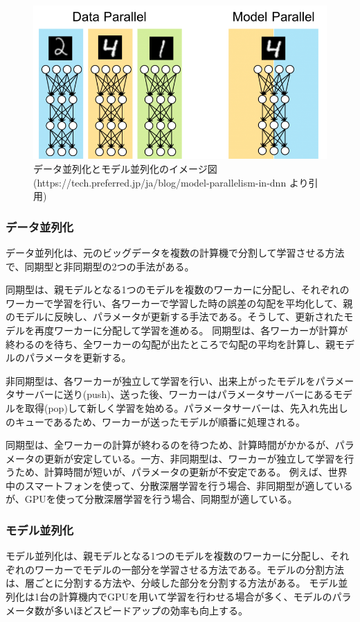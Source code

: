 \documentclass{ltjsarticle}
\begin{document}
\begin{figure}[htbp]
  \centering
  \includegraphics[width=15cm]{./capture/parallelism.png}
  \caption{データ並列化とモデル並列化のイメージ図(https://tech.preferred.jp/ja/blog/model-parallelism-in-dnn より引用)}
  \label{fig:parallelism}
\end{figure}

\subsubsection{データ並列化}
データ並列化は、元のビッグデータを複数の計算機で分割して学習させる方法で、同期型と非同期型の2つの手法がある。
\par
同期型は、親モデルとなる1つのモデルを複数のワーカーに分配し、それぞれのワーカーで学習を行い、各ワーカーで学習した時の誤差の勾配を平均化して、親のモデルに反映し、パラメータが更新する手法である。そうして、更新されたモデルを再度ワーカーに分配して学習を進める。
同期型は、各ワーカーが計算が終わるのを待ち、全ワーカーの勾配が出たところで勾配の平均を計算し、親モデルのパラメータを更新する。
\par
非同期型は、各ワーカーが独立して学習を行い、出来上がったモデルをパラメータサーバーに送り(push)、送った後、ワーカーはパラメータサーバーにあるモデルを取得(pop)して新しく学習を始める。パラメータサーバーは、先入れ先出しのキューであるため、ワーカーが送ったモデルが順番に処理される。
\par
同期型は、全ワーカーの計算が終わるのを待つため、計算時間がかかるが、パラメータの更新が安定している。一方、非同期型は、ワーカーが独立して学習を行うため、計算時間が短いが、パラメータの更新が不安定である。
例えば、世界中のスマートフォンを使って、分散深層学習を行う場合、非同期型が適しているが、GPUを使って分散深層学習を行う場合、同期型が適している。

\subsubsection{モデル並列化}
モデル並列化は、親モデルとなる1つのモデルを複数のワーカーに分配し、それぞれのワーカーでモデルの一部分を学習させる方法である。モデルの分割方法は、層ごとに分割する方法や、分岐した部分を分割する方法がある。
モデル並列化は1台の計算機内でGPUを用いて学習を行わせる場合が多く、モデルのパラメータ数が多いほどスピードアップの効率も向上する。
\end{document}
